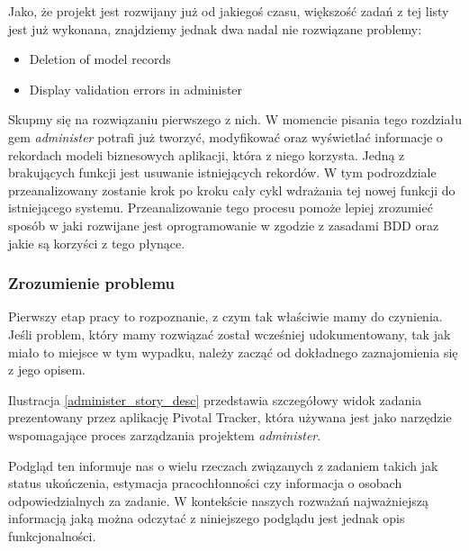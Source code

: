     Jako, że projekt jest rozwijany już od jakiegoś czasu, większość zadań z tej listy jest już wykonana, znajdziemy jednak dwa nadal nie rozwiązane problemy:
    
    \begin{itemize}
      \item Deletion of model records
      \item Display validation errors in administer
    \end{itemize}
    
    Skupmy się na rozwiązaniu pierwszego z nich. W momencie pisania tego rozdziału gem \emph{administer} potrafi już tworzyć, modyfikować oraz wyświetlać informacje o rekordach modeli biznesowych aplikacji, która z niego korzysta. Jedną z brakujących funkcji jest usuwanie istniejących rekordów. W tym podrozdziale przeanalizowany zostanie krok po kroku cały cykl wdrażania tej nowej funkcji do istniejącego systemu. Przeanalizowanie tego procesu pomoże lepiej zrozumieć sposób w jaki rozwijane jest oprogramowanie w zgodzie z zasadami BDD oraz jakie są korzyści z tego płynące.
    
    \subsubsection{Zrozumienie problemu}
    Pierwszy etap pracy to rozpoznanie, z czym tak właściwie mamy do czynienia. Jeśli problem, który mamy rozwiązać został wcześniej udokumentowany, tak jak miało to miejsce w tym wypadku, należy zacząć od dokładnego zaznajomienia się z jego opisem.
    
    Ilustracja \ref{administer_story_desc} przedstawia szczegółowy widok zadania prezentowany przez aplikację Pivotal Tracker, która używana jest jako narzędzie wspomagające proces zarządzania projektem \emph{administer}.
    
    Podgląd ten informuje nas o wielu rzeczach związanych z zadaniem takich jak status ukończenia, estymacja pracochłonności czy informacja o osobach odpowiedzialnych za zadanie. W kontekście naszych rozważań najważniejszą informacją jaką można odczytać z niniejszego podglądu jest jednak opis funkcjonalności. 
    
